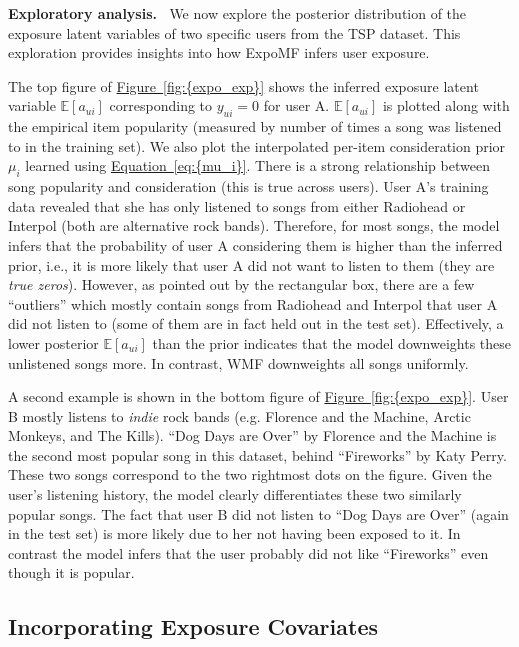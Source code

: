 \documentclass{sig-alternate-arxiv}
\begin{document}
{\vspace{0.1in}\noindent \textbf{{Exploratory analysis.} \,}} We now explore the
posterior distribution of the exposure latent variables of two specific users from the TSP dataset. This
exploration provides insights into how ExpoMF infers user exposure. 

The top figure of {\hyperref[fig:{expo_exp}]{Figure~\ref*{fig:{expo_exp}}}} shows the inferred exposure latent variable
$\mathbb{E}[a_{ui}]$ corresponding to $y_{ui} = 0$ for user A.
$\mathbb{E}[a_{ui}]$ is plotted along with the empirical item popularity
(measured by number of times a song was listened to in the training set).
We also plot the interpolated per-item consideration prior $\mu_i$ 
learned using {\hyperref[eq:{mu_i}]{Equation~\ref*{eq:{mu_i}}}}. There is a strong relationship between song
popularity and consideration (this is true across users). User A's
training data revealed that she has only listened to songs from either
Radiohead or Interpol (both are alternative rock bands). Therefore, for
most songs, the model infers that the probability of user A considering
them is higher than the inferred prior, i.e., it is more likely that user
A did not want to listen to them (they are \emph{true zeros}). However, as
pointed out by the rectangular box, there
are a few ``outliers'' which mostly contain songs from Radiohead and
Interpol that user A did not listen to (some of them are in fact held out
in the test set). Effectively, a lower posterior $\mathbb{E}[a_{ui}]$ than
the prior indicates that the model downweights these unlistened songs
more. In contrast, WMF downweights all songs uniformly. 

A second example is shown in the bottom figure of {\hyperref[fig:{expo_exp}]{Figure~\ref*{fig:{expo_exp}}}}. User B mostly
listens to \emph{indie} rock bands (e.g. Florence and the Machine, Arctic
Monkeys, and The Kills). ``Dog Days are Over'' by Florence and the Machine
is the second most popular song in this dataset, behind ``Fireworks'' by
Katy Perry. These two songs correspond to the two rightmost dots on the
figure. Given the user's listening history, the model clearly
differentiates these two similarly popular songs. The fact that user B did
not listen to ``Dog Days are Over'' (again in the test set) is more likely
due to her not having been exposed to it. In contrast the model infers
that the user probably did not like ``Fireworks'' even though it is
popular.

\subsection{Incorporating Exposure Covariates}
\end{document}
